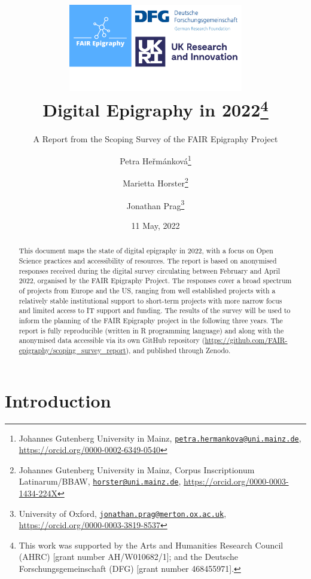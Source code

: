 \documentclass[
  12pt,
]{scrreprt}
\title{\includegraphics[width=3in,height=\textheight]{../assets/banner.png}\\
Digital Epigraphy in 2022\footnote{This work was supported by the Arts
  and Humanities Research Council (AHRC) {[}grant number
  AH/W010682/1{]}; and the Deutsche Forschungsgemeinschaft (DFG)
  {[}grant number 468455971{]}.}}
\subtitle{A Report from the Scoping Survey of the FAIR Epigraphy
Project}
\author{Petra Heřmánková\footnote{Johannes Gutenberg University in
  Mainz,
  \href{mailto:petra.hermankova@uni.mainz.de}{\nolinkurl{petra.hermankova@uni.mainz.de}},
  \url{https://orcid.org/0000-0002-6349-0540}} \and Marietta
Horster\footnote{Johannes Gutenberg University in Mainz, Corpus
  Inscriptionum Latinarum/BBAW,
  \href{mailto:horster@uni.mainz.de}{\nolinkurl{horster@uni.mainz.de}},
  \url{https://orcid.org/0000-0003-1434-224X}} \and Jonathan
Prag\footnote{University of Oxford,
  \href{mailto:jonathan.prag@merton.ox.ac.uk}{\nolinkurl{jonathan.prag@merton.ox.ac.uk}},
  \url{https://orcid.org/0000-0003-3819-8537}}}
\date{11 May, 2022}
\begin{document}
\maketitle
\begin{abstract}
This document maps the state of digital epigraphy in 2022, with a focus
on Open Science practices and accessibility of resources. The report is
based on anonymised responses received during the digital survey
circulating between February and April 2022, organised by the FAIR
Epigraphy Project. The responses cover a broad spectrum of projects from
Europe and the US, ranging from well established projects with a
relatively stable institutional support to short-term projects with more
narrow focus and limited access to IT support and funding. The results
of the survey will be used to inform the planning of the FAIR Epigraphy
project in the following three years. The report is fully reproducible
(written in R programming language) and along with the anonymised data
accessible via its own GitHub repository
(\url{https://github.com/FAIR-epigraphy/scoping_survey_report}), and
published through Zenodo.
\end{abstract}

{
\hypersetup{linkcolor=}
\setcounter{tocdepth}{2}
\tableofcontents
}
\hypertarget{introduction}{%
\chapter{Introduction}\label{introduction}}
\end{document}

